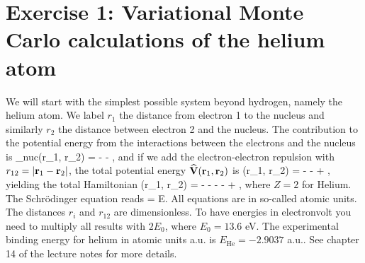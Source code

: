 \section*{Exercise 1: Variational Monte Carlo calculations of the helium atom}

We will start with the simplest possible system beyond hydrogen, namely the helium atom. We label $r_1$ the distance from electron 1 to the nucleus and similarly $r_2$ the distance between electron 2 and the nucleus. The contribution to the potential energy from the interactions between the 
electrons and the nucleus is
\be
   _{nuc}(\vec r_1, \vec r_2) 
   = 
   - - ,
\ee 
and if we add the electron-electron repulsion with $r_{12}=|{\bf r}_1-{\bf r}_2|$, the total potential energy  ${\bf\widehat{V}}(\mathbf r_1, \mathbf r_2)$ is
\be
 (\vec r_1, \vec r_2)
 =
 -  - 
 + ,
\ee
yielding the total Hamiltonian
\be
   (\vec r_1, \vec r_2) 
   = 
   - -
   -  - 
   + ,
\ee
where $Z=2$ for Helium. The Schr\"odinger equation reads
\be
   \psi = E\psi.
\ee
All equations are in so-called atomic units. The distances $r_i$ and $r_{12}$ are dimensionless. To have energies in electronvolt you need to multiply all results with $2E_0$, where $E_0=13.6$ eV. The experimental binding energy for helium in atomic units a.u. is $E_{\mathrm{He}}=-2.9037$ a.u.. See chapter 14 of the lecture notes\cite{computationalphysics} for more details.


